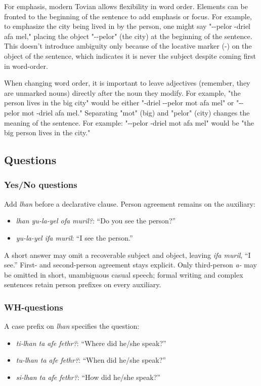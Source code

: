 \documentclass[letterpaper,twocolumn,openany,nodeprecatedcode,hidelinks]{dndbook}
\begin{document}
For emphasis, modern Tovian allows flexibility in word order. Elements can be fronted to the beginning of the sentence to add emphasis or focus. For example, to emphasize the city being lived in by the person, one might say "\CAloc-\CLin-pelor \CLan-driel afa mel," placing the object "\CAloc-\CLin-pelor" (the city) at the beginning of the sentence. This doesn't introduce ambiguity only because of the locative marker (\CAloc-) on the object of the sentence, which indicates it is never the subject despite coming first in word-order.

When changing word order, it is important to leave adjectives (remember, they are unmarked nouns) directly after the noun they modify. For example, "the person lives in the big city" would be either "\CLan-driel \CAloc-\CLin-pelor mot afa mel" or "\CAloc-\CLin-pelor mot \CLan-driel afa mel." Separating "mot" (big) and "pelor" (city) changes the meaning of the sentence. For example: "\CAloc-\CLin-pelor \CLan-driel mot afa mel" would be "the big person lives in the city."




\subsection*{Questions}
\subsubsection{Yes/No questions}
Add \textit{lhan} before a declarative clause. Person agreement remains on the auxiliary:

\begin{itemize}
\item \textit{lhan yu-la-yel ofa muril?}: ``Do you see the person?''
\item \textit{yu-la-yel ifa muril}: ``I see the person.''
\end{itemize}

A short answer may omit a recoverable subject and object, leaving \textit{ifa muril}, ``I see.'' First- and second-person agreement stays explicit. Only third-person \textit{a-} may be omitted in short, unambiguous casual speech; formal writing and complex sentences retain person prefixes on every auxiliary.

\subsubsection{WH-questions}
A case prefix on \textit{lhan} specifies the question:
\begin{itemize}
\item \textit{ti-lhan ta afe fethr?}: ``Where did he/she speak?''
\item \textit{tu-lhan ta afe fethr?}: ``When did he/she speak?''
\item \textit{si-lhan ta afe fethr?}: ``How did he/she speak?''
\end{itemize}
\end{document}
